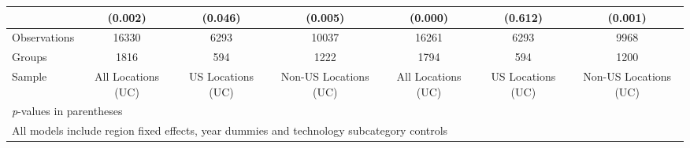 \begin{table}[htbp]
\begin{tabular}{l*{6}{c}}
                &  (0.002)&  (0.046)&  (0.005)&  (0.000)&  (0.612)&  (0.001)\\
\hline
Observations    &    16330&     6293&    10037&    16261&     6293&     9968\\
Groups          &     1816&      594&     1222&     1794&      594&     1200\\
Sample          &All Locations (UC)&US Locations (UC)&Non-US Locations (UC)&All Locations (UC)&US Locations (UC)&Non-US Locations (UC)\\
\hline\hline
\multicolumn{7}{l}{\footnotesize \textit{p}-values in parentheses}\\
\multicolumn{7}{l}{\footnotesize All models include region fixed effects, year dummies and technology subcategory controls}\\
\end{tabular}
\end{table}
